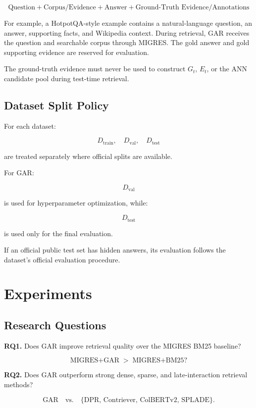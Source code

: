 \documentclass[11pt,a4paper]{article}
\begin{document}
\[
\boxed{
\text{Question}
+
\text{Corpus/Evidence}
+
\text{Answer}
+
\text{Ground-Truth Evidence/Annotations}
}
\]

For example, a HotpotQA-style example contains a natural-language question, an answer, supporting facts, and Wikipedia context. During retrieval, GAR receives the question and searchable corpus through MIGRES. The gold answer and gold supporting evidence are reserved for evaluation.

The ground-truth evidence must never be used to construct $G_t$, $E_t$, or the ANN candidate pool during test-time retrieval.

\subsection{Dataset Split Policy}

For each dataset:

\[
D_{\mathrm{train}},\quad
D_{\mathrm{val}},\quad
D_{\mathrm{test}}
\]

are treated separately where official splits are available.

For GAR:

\[
D_{\mathrm{val}}
\]

is used for hyperparameter optimization, while:

\[
D_{\mathrm{test}}
\]

is used only for the final evaluation.

If an official public test set has hidden answers, its evaluation follows the dataset's official evaluation procedure.

\section{Experiments}

\subsection{Research Questions}

\textbf{RQ1.} Does GAR improve retrieval quality over the MIGRES BM25 baseline?

\[
\boxed{
\text{MIGRES+GAR}
\;>\;
\text{MIGRES+BM25}?
}
\]

\textbf{RQ2.} Does GAR outperform strong dense, sparse, and late-interaction retrieval methods?

\[
\text{GAR}
\quad\text{vs.}\quad
\{\text{DPR, Contriever, ColBERTv2, SPLADE}\}.
\]
\end{document}
